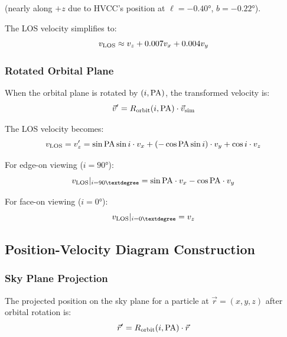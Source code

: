 \documentclass[twocolumn,amsmath,amssymb,prd,superscriptaddress,nofootinbib]{revtex4-2}
\begin{document}
(nearly along $+z$ due to HVCC's position at $\ell = -0.40°$, $b = -0.22°$).

The LOS velocity simplifies to:
\begin{equation}
    v_{\rm LOS} \approx v_z + 0.007 v_x + 0.004 v_y
\end{equation}

\subsubsection{Rotated Orbital Plane}

When the orbital plane is rotated by $(i, {\rm PA})$, the transformed velocity is:
\begin{equation}
    \vec{v}' = R_{\rm orbit}(i, {\rm PA}) \cdot \vec{v}_{\rm sim}
\end{equation}

The LOS velocity becomes:
\begin{equation}
    v_{\rm LOS} = v_z' = \sin{\rm PA}\sin i \cdot v_x + (-\cos{\rm PA}\sin i) \cdot v_y + \cos i \cdot v_z
    \label{eq:v_los_rotated}
\end{equation}

For edge-on viewing ($i = 90°$):
\begin{equation}
    v_{\rm LOS}|_{i=90°} = \sin{\rm PA} \cdot v_x - \cos{\rm PA} \cdot v_y
\end{equation}

For face-on viewing ($i = 0°$):
\begin{equation}
    v_{\rm LOS}|_{i=0°} = v_z
\end{equation}

\subsection{Position-Velocity Diagram Construction}
\label{sec:pv_construction}

\subsubsection{Sky Plane Projection}

The projected position on the sky plane for a particle at $\vec{r} = (x, y, z)$ after orbital rotation is:
\begin{equation}
    \vec{r}' = R_{\rm orbit}(i, {\rm PA}) \cdot \vec{r}
\end{equation}
\end{document}
